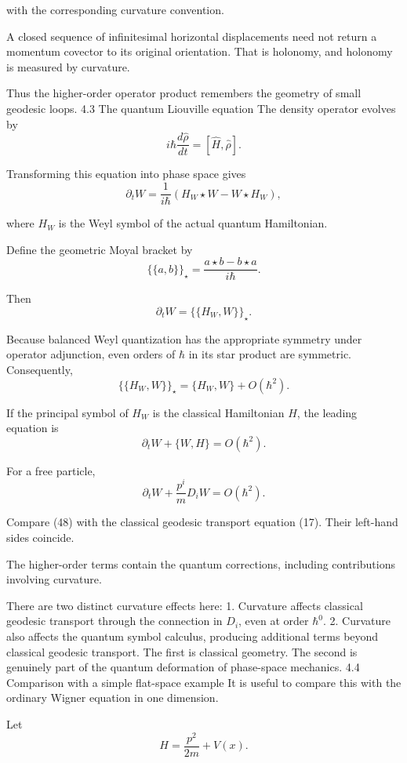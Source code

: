 with the corresponding curvature convention.

A closed sequence of infinitesimal horizontal displacements need not return a momentum covector to its original orientation. That is holonomy, and holonomy is measured by curvature.

Thus the higher-order operator product remembers the geometry of small geodesic loops.
4.3 The quantum Liouville equation
The density operator evolves by
\[
i\hbar\frac{d\widehat\rho}{dt}
=
[\widehat H,\widehat\rho].
\tag{42}
\]

Transforming this equation into phase space gives
\[
\boxed{
\partial_tW
=
\frac1{i\hbar}
\left(
H_W\star W-W\star H_W
\right),
}
\tag{43}
\]

where \(H_W\) is the Weyl symbol of the actual quantum Hamiltonian.

Define the geometric Moyal bracket by
\[
\{\!\{a,b\}\!\}_\star
=
\frac{a\star b-b\star a}{i\hbar}.
\tag{44}
\]

Then
\[
\partial_tW=\{\!\{H_W,W\}\!\}_\star.
\tag{45}
\]

Because balanced Weyl quantization has the appropriate symmetry under operator adjunction, even orders of \(\hbar\) in its star product are symmetric. Consequently,
\[
\{\!\{H_W,W\}\!\}_\star
=
\{H_W,W\}+O(\hbar^2).
\tag{46}
\]

If the principal symbol of \(H_W\) is the classical Hamiltonian \(H\), the leading equation is
\[
\boxed{
\partial_tW+\{W,H\}=O(\hbar^2).
}
\tag{47}
\]

For a free particle,
\[
\boxed{
\partial_tW+\frac{p^i}{m}D_iW
=
O(\hbar^2).
}
\tag{48}
\]

Compare (48) with the classical geodesic transport equation (17). Their left-hand sides coincide.

The higher-order terms contain the quantum corrections, including contributions involving curvature.

There are two distinct curvature effects here:
1. Curvature affects classical geodesic transport through the connection in \(D_i\), even at order \(\hbar^0\).
2. Curvature also affects the quantum symbol calculus, producing additional terms beyond classical geodesic transport.
The first is classical geometry. The second is genuinely part of the quantum deformation of phase-space mechanics.
4.4 Comparison with a simple flat-space example
It is useful to compare this with the ordinary Wigner equation in one dimension.

Let
\[
H=\frac{p^2}{2m}+V(x).
\]

